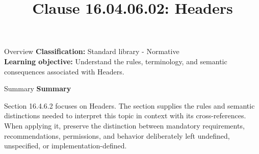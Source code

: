 \documentclass[10pt,letterpaper]{article}
\title{Clause 16.04.06.02: Headers}
\author{}
\date{}
\begin{document}
\maketitle
\begin{CornellOverviewBox}{Overview}
\textbf{Classification:} Standard library - Normative\\[2pt]
\textbf{Learning objective:} Understand the rules, terminology, and semantic consequences associated with Headers.
\end{CornellOverviewBox}\begin{CornellSummaryBox}{Summary}
{\sffamily\bfseries\color{Accent} Summary}\par\vspace{3pt}Section 16.4.6.2 focuses on Headers. The section supplies the rules and semantic distinctions needed to interpret this topic in context with its cross-references. When applying it, preserve the distinction between mandatory requirements, recommendations, permissions, and behavior deliberately left undefined, unspecified, or implementation-defined.
\end{CornellSummaryBox}
\end{document}
